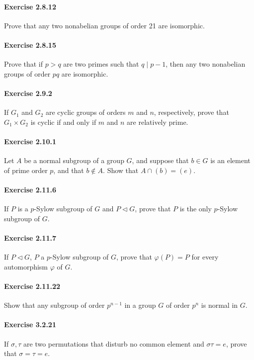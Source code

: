 \documentclass{article}
\begin{document}
\paragraph{Exercise 2.8.12} Prove that any two nonabelian groups of order 21 are isomorphic.

\paragraph{Exercise 2.8.15} Prove that if $p > q$ are two primes such that $q \mid p - 1$, then any two nonabelian groups of order $pq$ are isomorphic.

\paragraph{Exercise 2.9.2} If $G_1$ and $G_2$ are cyclic groups of orders $m$ and $n$, respectively, prove that $G_1 \times G_2$ is cyclic if and only if $m$ and $n$ are relatively prime.

\paragraph{Exercise 2.10.1} Let $A$ be a normal subgroup of a group $G$, and suppose that $b \in G$ is an element of prime order $p$, and that $b \not\in A$. Show that $A \cap (b) = (e)$.

\paragraph{Exercise 2.11.6} If $P$ is a $p$-Sylow subgroup of $G$ and $P \triangleleft G$, prove that $P$ is the only $p$-Sylow subgroup of $G$.

\paragraph{Exercise 2.11.7} If $P \triangleleft G$, $P$ a $p$-Sylow subgroup of $G$, prove that $\varphi(P) = P$ for every automorphism $\varphi$ of $G$.

\paragraph{Exercise 2.11.22} Show that any subgroup of order $p^{n-1}$ in a group $G$ of order $p^n$ is normal in $G$.

\paragraph{Exercise 3.2.21} If $\sigma, \tau$ are two permutations that disturb no common element and $\sigma \tau = e$, prove that $\sigma = \tau = e$.
\end{document}
